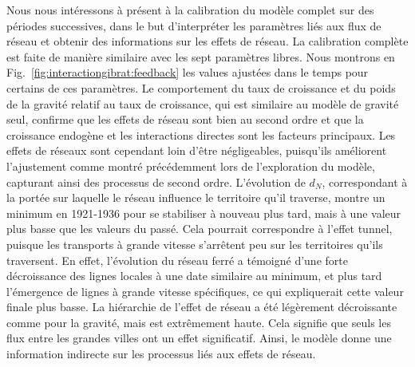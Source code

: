 {Nous nous intéressons à présent à la calibration du modèle complet sur des périodes successives, dans le but d'interpréter les paramètres liés aux flux de réseau et obtenir des informations sur les effets de réseau. La calibration complète est faite de manière similaire avec les sept paramètres libres. Nous montrons en Fig.~\ref{fig:interactiongibrat:feedback} les values ajustées dans le temps pour certains de ces paramètres. Le comportement du taux de croissance et du poids de la gravité relatif au taux de croissance, qui est similaire au modèle de gravité seul, confirme que les effets de réseau sont bien au second ordre et que la croissance endogène et les interactions directes sont les facteurs principaux. Les effets de réseaux sont cependant loin d'être négligeables, puisqu'ils améliorent l'ajustement comme montré précédemment lors de l'exploration du modèle, capturant ainsi des processus de second ordre. L'évolution de $d_N$, correspondant à la portée sur laquelle le réseau influence le territoire qu'il traverse, montre un minimum en 1921-1936 pour se stabiliser à nouveau plus tard, mais à une valeur plus basse que les valeurs du passé. Cela pourrait correspondre à l'effet tunnel, puisque les transports à grande vitesse s'arrêtent peu sur les territoires qu'ils traversent. En effet, l'évolution du réseau ferré a témoigné d'une forte décroissance des lignes locales à une date similaire au minimum, et plus tard l'émergence de lignes à grande vitesse spécifiques, ce qui expliquerait cette valeur finale plus basse. La hiérarchie de l'effet de réseau a été légèrement décroissante comme pour la gravité, mais est extrêmement haute. Cela signifie que seuls les flux entre les grandes villes ont un effet significatif. Ainsi, le modèle donne une information indirecte sur les processus liés aux effets de réseau.
}






